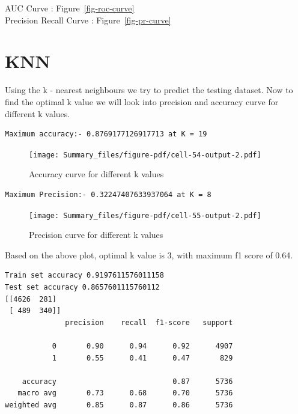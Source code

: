 \documentclass[
  letterpaper,
  DIV=11,
  numbers=noendperiod]{scrartcl}
\begin{document}
AUC Curve : Figure~\ref{fig-roc-curve}\\
Precision Recall Curve : Figure~\ref{fig-pr-curve}

\hypertarget{knn}{%
\section{KNN}\label{knn}}

Using the k - nearest neighbours we try to predict the testing dataset.
Now to find the optimal k value we will look into precision and accuracy
curve for different k values.

\begin{verbatim}
Maximum accuracy:- 0.8769177126917713 at K = 19
\end{verbatim}

\begin{figure}

{\centering \texttt{[image: Summary\_files/figure-pdf/cell-54-output-2.pdf]}

}

\caption{Accuracy curve for different k values}

\end{figure}

\begin{verbatim}
Maximum Precision:- 0.32247407633937064 at K = 8
\end{verbatim}

\begin{figure}

{\centering \texttt{[image: Summary\_files/figure-pdf/cell-55-output-2.pdf]}

}

\caption{Precision curve for different k values}

\end{figure}

Based on the above plot, optimal k value is 3, with maximum f1 score of
0.64.

\begin{verbatim}
Train set accuracy 0.9197611576011158
Test set accuracy 0.8657601115760112
[[4626  281]
 [ 489  340]]
              precision    recall  f1-score   support

           0       0.90      0.94      0.92      4907
           1       0.55      0.41      0.47       829

    accuracy                           0.87      5736
   macro avg       0.73      0.68      0.70      5736
weighted avg       0.85      0.87      0.86      5736
\end{verbatim}
\end{document}

